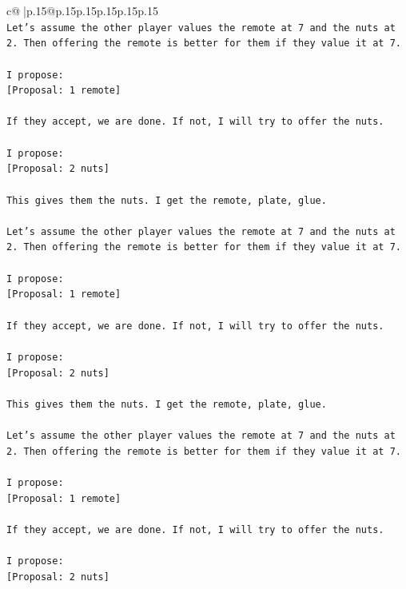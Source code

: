 \documentclass{article}
\begin{document}
{\begin{supertabular}{c@{$\;$}|p{.15\linewidth}@{}p{.15\linewidth}p{.15\linewidth}p{.15\linewidth}p{.15\linewidth}p{.15\linewidth}}
{{{\\ 
\texttt{Let's assume the other player values the remote at 7 and the nuts at 2. Then offering the remote is better for them if they value it at 7.} \\
\\ 
\texttt{I propose:} \\
\texttt{{[}Proposal: 1 remote{]}} \\
\\ 
\texttt{If they accept, we are done. If not, I will try to offer the nuts.} \\
\\ 
\texttt{I propose:} \\
\texttt{{[}Proposal: 2 nuts{]}} \\
\\ 
\texttt{This gives them the nuts. I get the remote, plate, glue.} \\
\\ 
\texttt{Let's assume the other player values the remote at 7 and the nuts at 2. Then offering the remote is better for them if they value it at 7.} \\
\\ 
\texttt{I propose:} \\
\texttt{{[}Proposal: 1 remote{]}} \\
\\ 
\texttt{If they accept, we are done. If not, I will try to offer the nuts.} \\
\\ 
\texttt{I propose:} \\
\texttt{{[}Proposal: 2 nuts{]}} \\
\\ 
\texttt{This gives them the nuts. I get the remote, plate, glue.} \\
\\ 
\texttt{Let's assume the other player values the remote at 7 and the nuts at 2. Then offering the remote is better for them if they value it at 7.} \\
\\ 
\texttt{I propose:} \\
\texttt{{[}Proposal: 1 remote{]}} \\
\\ 
\texttt{If they accept, we are done. If not, I will try to offer the nuts.} \\
\\ 
\texttt{I propose:} \\
\texttt{{[}Proposal: 2 nuts{]}} \\
\\ 
}}}
\end{supertabular}}
\end{document}
